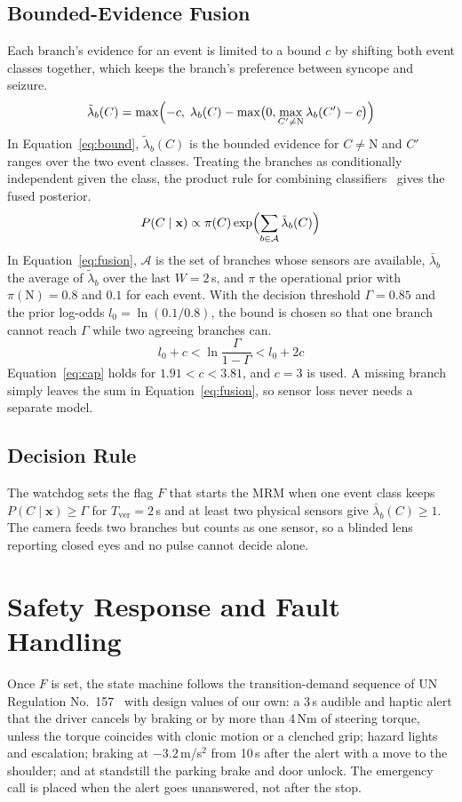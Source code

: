 \documentclass[conference]{IEEEtran}
\begin{document}
\subsection{Bounded-Evidence Fusion}
Each branch's evidence for an event is limited to a bound $c$ by shifting both event classes together, which keeps the branch's preference between syncope and seizure.
\begin{equation}
\tilde\lambda_b(C)=\max\Bigl(-c,\;\lambda_b(C)-\max\bigl(0,\max_{C'\neq\mathrm{N}}\lambda_b(C')-c\bigr)\Bigr)
\label{eq:bound}
\end{equation}
In Equation~\eqref{eq:bound}, $\tilde\lambda_b(C)$ is the bounded evidence for $C\neq\mathrm{N}$ and $C'$ ranges over the two event classes. Treating the branches as conditionally independent given the class, the product rule for combining classifiers~\cite{kittler1998} gives the fused posterior.
\begin{equation}
P(C\mid\mathbf{x})\propto\pi(C)\exp\Bigl(\sum_{b\in\mathcal{A}}\bar\lambda_b(C)\Bigr)
\label{eq:fusion}
\end{equation}
In Equation~\eqref{eq:fusion}, $\mathcal{A}$ is the set of branches whose sensors are available, $\bar\lambda_b$ the average of $\tilde\lambda_b$ over the last $W=2$\,s, and $\pi$ the operational prior with $\pi(\mathrm{N})=0.8$ and $0.1$ for each event. With the decision threshold $\Gamma=0.85$ and the prior log-odds $l_0=\ln(0.1/0.8)$, the bound is chosen so that one branch cannot reach $\Gamma$ while two agreeing branches can.
\begin{equation}
l_0+c<\ln\frac{\Gamma}{1-\Gamma}<l_0+2c
\label{eq:cap}
\end{equation}
Equation~\eqref{eq:cap} holds for $1.91<c<3.81$, and $c=3$ is used. A missing branch simply leaves the sum in Equation~\eqref{eq:fusion}, so sensor loss never needs a separate model.

\subsection{Decision Rule}
The watchdog sets the flag $F$ that starts the MRM when one event class keeps $P(C\mid\mathbf{x})\ge\Gamma$ for $T_{\mathrm{ver}}=2$\,s and at least two physical sensors give $\bar\lambda_b(C)\ge1$. The camera feeds two branches but counts as one sensor, so a blinded lens reporting closed eyes and no pulse cannot decide alone.

\section{Safety Response and Fault Handling}
Once $F$ is set, the state machine follows the transition-demand sequence of UN Regulation No.~157~\cite{unece157} with design values of our own: a 3\,s audible and haptic alert that the driver cancels by braking or by more than 4\,Nm of steering torque, unless the torque coincides with clonic motion or a clenched grip; hazard lights and escalation; braking at $-3.2$\,m/s$^2$ from 10\,s after the alert with a move to the shoulder; and at standstill the parking brake and door unlock. The emergency call is placed when the alert goes unanswered, not after the stop.
\end{document}
